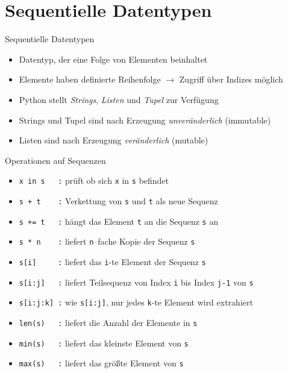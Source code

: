 \documentclass[utf8, smaller, c]{beamer}
\renewcommand{\tt}[1]{{\texttt{#1}}}
\begin{document}
\section{Sequentielle Datentypen}
\begin{frame}{Sequentielle Datentypen}
	\begin{itemize}
		\item Datentyp, der eine Folge von Elementen beinhaltet
		\item Elemente haben definierte Reihenfolge $\rightarrow$ Zugriff über Indizes möglich
		\item Python stellt \textit{Strings}, \textit{Listen} und \textit{Tupel} zur Verfügung
		\item Strings und Tupel sind nach Erzeugung \textit{unveränderlich} (immutable)
		\item Listen sind nach Erzeugung \textit{veränderlich} (mutable)
	\end{itemize}

	\pagebreak

	\begin{block}{Operationen auf Sequenzen}
	\begin{itemize}
		\item \verb+x in s   :+ prüft ob sich \tt{x} in \tt{s} befindet
		\item \verb|s + t    :| Verkettung von \tt{s} und \tt{t} als neue Sequenz
		\item \verb|s += t   :| hängt das Element \tt{t} an die Sequenz \tt{s} an
		\item \verb+s * n    :+ liefert \tt{n}--fache Kopie der Sequenz \tt{s}
		\item \verb+s[i]     :+ liefert das \tt{i}-te Element der Sequenz \tt{s}
		\item \verb+s[i:j]   :+ liefert Teilsequenz von Index \tt{i} bis Index \tt{j-1} von \tt{s}
		\item \verb+s[i:j:k] :+ wie \tt{s[i:j]}, nur jedes \tt{k}-te Element wird extrahiert
		\item \verb+len(s)   :+ liefert die Anzahl der Elemente in \tt{s}
		\item \verb+min(s)   :+ liefert das kleinste Element von \tt{s}
		\item \verb+max(s)   :+ liefert das größte Element von \tt{s}
	\end{itemize}
	\end{block}
\end{frame}
\end{document}
